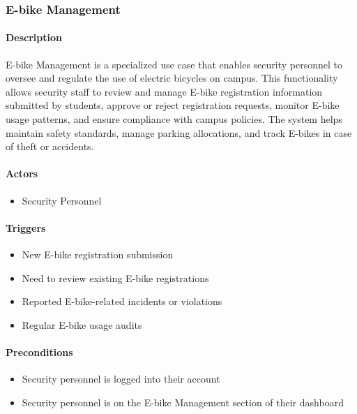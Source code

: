 \subsubsection{E-bike Management}

\paragraph{Description}
E-bike Management is a specialized use case that enables security personnel to oversee and regulate the use of electric bicycles on campus. This functionality allows security staff to review and manage E-bike registration information submitted by students, approve or reject registration requests, monitor E-bike usage patterns, and ensure compliance with campus policies. The system helps maintain safety standards, manage parking allocations, and track E-bikes in case of theft or accidents.

\paragraph{Actors}
\begin{itemize}
    \item Security Personnel
\end{itemize}

\paragraph{Triggers}
\begin{itemize}
    \item New E-bike registration submission
    \item Need to review existing E-bike registrations
    \item Reported E-bike-related incidents or violations
    \item Regular E-bike usage audits
\end{itemize}

\paragraph{Preconditions}
\begin{itemize}
    \item Security personnel is logged into their account
    \item Security personnel is on the E-bike Management section of their dashboard
\end{itemize}


